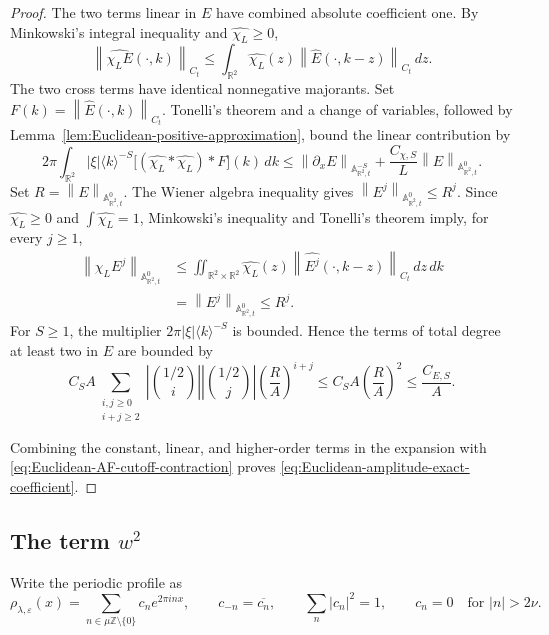 \documentclass[12pt,reqno,letterpaper]{amsart}
\numberwithin{equation}{section}
\theoremstyle{definition}
\newcommand{\R}{\mathbb R}
\newcommand{\Z}{\mathbb Z}
\newcommand{\A}{\mathbb A}
\newcommand{\eps}{\varepsilon}
\newcommand{\la}{\lambda}
\newcommand{\norm}[1]{\left\lVert #1\right\rVert}
\newcommand{\abs}[1]{\left\lvert #1\right\rvert}
\begin{document}
\begin{proof}
The two terms linear in $E$ have combined absolute coefficient one.
By Minkowski's integral inequality and
$\widehat{\chi_L}\geq0$,
\begin{equation*}
   \norm{\widehat{\chi_LE}(\cdot,k)}_{C_t}
      \leq\int_{\R^2}\widehat{\chi_L}(z)
         \norm{\widehat E(\cdot,k-z)}_{C_t}\,dz.
\end{equation*}
The two cross terms have identical nonnegative majorants.  Set
$F(k)=\norm{\widehat E(\cdot,k)}_{C_t}$.  Tonelli's theorem and a change of
variables, followed by
Lemma~\ref{lem:Euclidean-positive-approximation}, bound the linear
contribution by
\[
 2\pi\int_{\R^2}\abs\xi\langle k\rangle^{-S}
   \bigl[(\widehat{\chi_L}*\widehat{\chi_L})*F\bigr](k)\,dk
 \leq \norm{\partial_xE}_{\A^{-S}_{\R^2,t}}
   +\frac{C_{\chi,S}}{L}\norm E_{\A^0_{\R^2,t}}.
\]
Set $R=\norm E_{\A^0_{\R^2,t}}$.  The Wiener algebra inequality gives
$\norm{E^j}_{\A^0_{\R^2,t}}\leq R^j$.  Since
$\widehat{\chi_L}\geq0$ and $\int\widehat{\chi_L}=1$, Minkowski's inequality
and Tonelli's theorem imply, for every $j\geq1$,
\begin{align*}
 \norm{\chi_LE^j}_{\A^0_{\R^2,t}}
 &\leq\iint_{\R^2\times\R^2}\widehat{\chi_L}(z)
    \norm{\widehat{E^j}(\cdot,k-z)}_{C_t}\,dz\,dk\\
 &=\norm{E^j}_{\A^0_{\R^2,t}}
 \leq R^j.
\end{align*}
For $S\geq1$, the multiplier
$2\pi\abs\xi\langle k\rangle^{-S}$ is bounded.  Hence the terms of total
degree at least two in $E$ are bounded by
\[
 C_SA\sum_{\substack{i,j\geq0\\i+j\geq2}}
   \abs{\binom{1/2}{i}}\abs{\binom{1/2}{j}}
   \left(\frac RA\right)^{i+j}
 \leq C_SA\left(\frac RA\right)^2
 \leq\frac{C_{E,S}}{A}.
\]

Combining the constant, linear, and higher-order terms in the expansion
with \eqref{eq:Euclidean-AF-cutoff-contraction} proves
\eqref{eq:Euclidean-amplitude-exact-coefficient}.
\end{proof}

\subsection{\texorpdfstring{The term $w^2$}{The term w squared}}

Write the periodic profile as
\begin{equation}\label{eq:Euclidean-localized-perturbation-Fourier}
    \rho_{\la,\eps}(x)
    =\sum_{n\in\mu\Z\setminus\{0\}}c_ne^{2\pi inx},
    \qquad
    c_{-n}=\overline{c_n},
    \qquad \sum_n\abs{c_n}^2=1,
    \qquad c_n=0\quad\text{for }\abs n>2\nu.
\end{equation}
\end{document}

